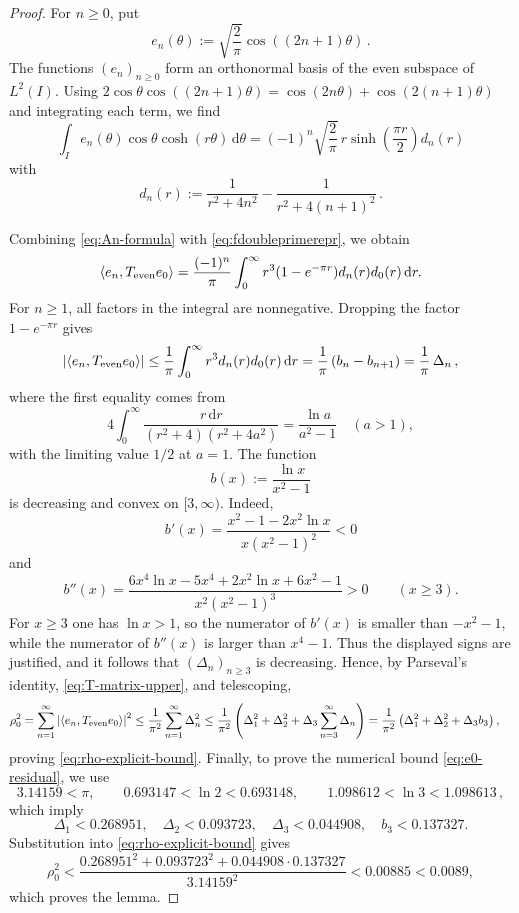 \documentclass[11pt]{article}
\theoremstyle{definition}
\theoremstyle{remark}
\newcommand{\ip}[2]{\left\langle #1,#2\right\rangle}
\newcommand{\abs}[1]{\left\lvert #1\right\rvert}
\newcommand{\dd}{\,\mathrm{d}}
\begin{document}
\begin{proof}
For $n\geq0$, put
\begin{equation}\label{eq:en-def}
e_n(\theta):=\sqrt{\frac2\pi}\cos((2n+1)\theta) \,.
\end{equation}
The functions $(e_n)_{n\geq0}$ form an orthonormal basis of the even
subspace of $L^2(I)$. Using
$2\cos\theta\cos((2n+1)\theta)
=\cos(2n\theta)+\cos(2(n+1)\theta)$ and integrating each term, we find
\begin{equation}\label{eq:An-formula}
\int_I e_n(\theta)\cos\theta\cosh(r\theta)\dd\theta
=(-1)^n\sqrt{\frac2\pi}\,
 r\sinh\left(\frac{\pi r}{2}\right)d_n(r)
\end{equation}
with
\begin{equation}\label{eq:dn-def}
d_n(r):=\frac{1}{r^2+4n^2}
-\frac{1}{r^2+4(n+1)^2} \,.
\end{equation}

Combining \eqref{eq:An-formula} with
\eqref{eq:fdoubleprimerepr},%
we obtain
\begin{equation}\label{eq:T-matrix-e0}
\ip{e_n}{T_{\rm even}e_0}
=\frac{(-1)^n}{\pi}\int_0^\infty
r^3(1-e^{-\pi r})d_n(r)d_0(r)\dd r.
\end{equation}
For $n\geq1$, all factors in the integral
are nonnegative.  Dropping the factor $1-e^{-\pi r}$ gives
\begin{equation}\label{eq:T-matrix-upper}
\abs{\ip{e_n}{T_{\rm even}e_0}}
\leq\frac1\pi\int_0^\infty r^3d_n(r)d_0(r)\dd r = \frac1\pi \left( b_n-b_{n+1}\right) = \frac1\pi\,\Delta_n \,,
\end{equation}
where the first equality comes from
\[
4\int_0^\infty
\frac{r\dd r}{(r^2+4)(r^2+4a^2)}
=\frac{\ln a}{a^2-1}\quad(a>1),
\]
with the limiting value $1/2$ at $a=1$.
The function
\[
b(x):=\frac{\ln x}{x^2-1}
\]
is decreasing and convex on $[3,\infty)$.  Indeed,
\[
b'(x)=\frac{x^2-1-2x^2\ln x}{x(x^2-1)^2}<0
\]
and
\[
b''(x)=
\frac{6x^4\ln x-5x^4+2x^2\ln x+6x^2-1}
{x^2(x^2-1)^3}>0
\qquad(x\geq3).
\]
For $x\geq3$ one has $\ln x>1$, so the numerator of $b'(x)$
is smaller than $-x^2-1$, while the numerator of $b''(x)$ is larger
than $x^4-1$.  Thus the displayed signs are justified, and it follows
that $(\Delta_n)_{n\geq3}$ is decreasing.  Hence, by
Parseval's identity, \eqref{eq:T-matrix-upper}, and telescoping,
\begin{align*}
\rho_0^2
&=\sum_{n=1}^\infty
\abs{\ip{e_n}{T_{\rm even}e_0}}^2\notag
\leq\frac1{\pi^2}\sum_{n=1}^\infty\Delta_n^2\notag
\leq\frac1{\pi^2}
\left(\Delta_1^2+\Delta_2^2
+\Delta_3\sum_{n=3}^\infty\Delta_n\right)\notag
=\frac1{\pi^2}
\left(\Delta_1^2+\Delta_2^2+\Delta_3b_3\right),
\end{align*}
proving \eqref{eq:rho-explicit-bound}.
Finally, to prove the numerical bound \eqref{eq:e0-residual}, we use
\[
3.14159<\pi,
\qquad
0.693147<\ln2<0.693148,
\qquad
1.098612<\ln3<1.098613 \,,
\]
which imply
\[
\Delta_1<0.268951,
\quad
\Delta_2<0.093723,
\quad
\Delta_3<0.044908,
\quad
b_3<0.137327.
\]
Substitution into \eqref{eq:rho-explicit-bound} gives
\[
\rho_0^2
<\frac{0.268951^2+0.093723^2+0.044908\cdot0.137327}
{3.14159^2}
<0.00885<0.0089,
\]
which proves the lemma.
\end{proof}
\end{document}
